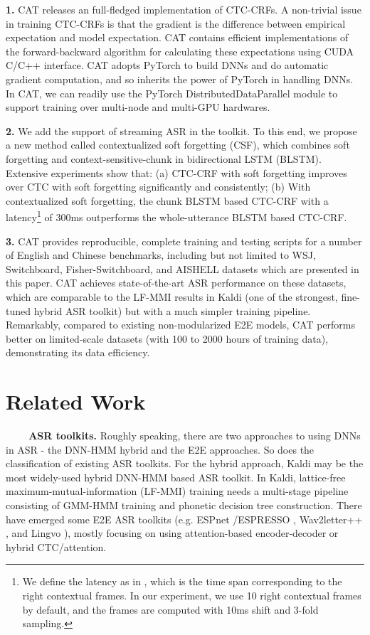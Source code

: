 \documentclass[a4paper]{article}
\begin{document}
\textbf{1.} 
CAT releases an full-fledged implementation of CTC-CRFs.
A non-trivial issue in training CTC-CRFs is that the gradient is the difference between empirical expectation and model expectation.
CAT contains efficient implementations of the forward-backward algorithm for calculating these expectations using CUDA C/C++ interface.
CAT adopts PyTorch \cite{paszke2017automatic} to build DNNs and do automatic gradient computation, and so inherits the power of PyTorch in handling DNNs.
In CAT, we can readily use the PyTorch DistributedDataParallel module to support training over multi-node and multi-GPU hardwares.

\textbf{2.} 
We add the support of streaming ASR in the toolkit.
To this end, we propose a new method called contextualized soft forgetting (CSF), which combines soft forgetting \cite{SForgetting} and  context-sensitive-chunk \cite{LC-BLSTM} in bidirectional LSTM (BLSTM).
Extensive experiments show that: (a) CTC-CRF with soft forgetting improves over CTC with soft forgetting significantly and consistently; (b) With contextualized soft forgetting, the chunk BLSTM based CTC-CRF with a latency\footnote{We define the latency as in \cite{SAN,CAS_transformer}, which is the time span corresponding to the right contextual frames. In our experiment, we use 10 right contextual frames by default, and the frames are computed with 10ms shift and 3-fold sampling.} of 300ms outperforms the whole-utterance BLSTM based CTC-CRF.

\textbf{3.} 
CAT provides reproducible, complete training and testing scripts for a number of English and Chinese benchmarks, including but not limited to WSJ, Switchboard, Fisher-Switchboard, and AISHELL datasets which are presented in this paper.
CAT achieves state-of-the-art ASR performance on these datasets, which are comparable to the LF-MMI \cite{povey2016purely} results in Kaldi (one of the strongest, fine-tuned hybrid ASR toolkit) but with a much simpler training pipeline. Remarkably, compared to existing non-modularized E2E models, CAT performs better on limited-scale datasets (with 100 to 2000 hours of training data), demonstrating its data efficiency.

\section{Related Work} \label{sec:related-work}

\textbf{~~~~ASR toolkits.} 
Roughly speaking, there are two approaches to using DNNs in ASR - the DNN-HMM hybrid and the E2E approaches. So does the classification of existing ASR toolkits.
For the hybrid approach, Kaldi \cite{Povey2012KALDI} may be the most widely-used hybrid DNN-HMM based ASR toolkit. In Kaldi, lattice-free maximum-mutual-information (LF-MMI) training needs a multi-stage pipeline consisting of GMM-HMM training and phonetic decision tree construction.
There have emerged some E2E ASR toolkits (e.g. ESPnet \cite{Watanabe2018ESPnet}/ESPRESSO \cite{wang2019espresso}, Wav2letter++ \cite{Pratap2018wav2letter}, and Lingvo \cite{shen2019lingvo}), mostly focusing on using attention-based encoder-decoder or hybrid CTC/attention.
\end{document}

